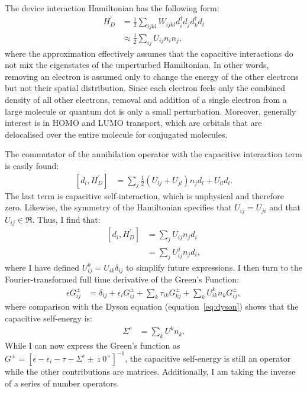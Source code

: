 The device interaction Hamiltonian has the following form:
\begin{align*}
H^\prime_D &= \frac{1}{2} \sum_{ijkl} W_{ijkl} d^\dagger_i d_j d^\dagger_k d_l \\
&\approx \frac{1}{2} \sum_{ij} U_{ij} n_i n_j,
\end{align*} where the approximation effectively assumes that the capacitive interactions do not mix the eigenstates of the unperturbed Hamiltonian. In other words, removing an electron is assumed only to change the energy of the other electrons but not their spatial distribution. Since each electron feels only the combined density of all other electrons, removal and addition of a single electron from a large molecule or quantum dot is only a small perturbation. Moreover, generally interest is in HOMO and LUMO transport, which are orbitals that are delocalised over the entire molecule for conjugated molecules.

The commutator of the annihilation operator with the capacitive interaction term is easily found:
\begin{align*}
\left[ d_l, H^\prime_D\right] &= \sum_{j} \frac{1}{2} \left( U_{lj} + U_{jl}\right) n_j d_l + U_{ll} d_l.
\end{align*}
The last term is capacitive self-interaction, which is unphysical and therefore zero. Likewise, the symmetry of the Hamiltonian specifies that $U_{ij} = U_{ji}$ and that $U_{ij} \in \Re$. Thus, I find that:
\begin{align*}
\left[ d_i, H^\prime_D\right] &=  \sum_{j}U_{ij} n_j d_i \\
&= \sum_j U^j_{ij} n_j d_i,
\end{align*}
where I have defined $U^k_{ij} = U_{ik} \delta_{ij}$ to simplify future expressions. I then turn to the Fourier-transformed full time derivative of the Green's Function:
\begin{align*}
\epsilon G_{ij}^\pm &= \delta_{ij} + \epsilon_i G_{ij}^\pm + \sum_k \tau_{ik} G_{kj}^\pm + \sum_k U^k_{ik} n_k G_{ij}^\pm,
\end{align*}
where comparison with the Dyson equation (equation~\ref{eq:dyson}) shows that the capacitive self-energy is:
\begin{align}
\Sigma^{c} &= \sum_k U^k n_k
\label{eq:selfenergycapacitive}.
\end{align} While I can now express the Green's function as $G^\pm = \left[ \epsilon - \epsilon_i - \tau - \Sigma^c \pm \imath 0^+\right]^{-1}$, the capacitive self-energy is still an operator while the other contributions are matrices. Additionally, I am taking the inverse of a series of number operators. 

